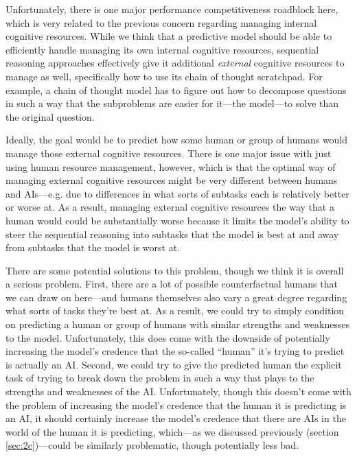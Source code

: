 \documentclass[
  onecolumn,
  nonatbib,
]{miri-tech-article}
\begin{document}
Unfortunately, there is one major performance competitiveness roadblock here, which is very related to the previous concern regarding managing internal cognitive resources. While we think that a predictive model should be able to efficiently handle managing its own internal cognitive resources, sequential reasoning approaches effectively give it additional \textit{external} cognitive resources to manage as well, specifically how to use its chain of thought scratchpad. For example, a chain of thought model has to figure out how to decompose questions in such a way that the subproblems are easier for it---the model---to solve than the original question.

Ideally, the goal would be to predict how some human or group of humans would manage those external cognitive resources. There is one major issue with just using human resource management, however, which is that the optimal way of managing external cognitive resources might be very different between humans and AIs---e.g. due to differences in what sorts of subtasks each is relatively better or worse at. As a result, managing external cognitive resources the way that a human would could be substantially worse because it limits the model's ability to steer the sequential reasoning into subtasks that the model is best at and away from subtasks that the model is worst at.

There are some potential solutions to this problem, though we think it is overall a serious problem. First, there are a lot of possible counterfactual humans that we can draw on here---and humans themselves also vary a great degree regarding what sorts of tasks they're best at. As a result, we could try to simply condition on predicting a human or group of humans with similar strengths and weaknesses to the model. Unfortunately, this does come with the downside of potentially increasing the model's credence that the so-called ``human'' it's trying to predict is actually an AI. Second, we could try to give the predicted human the explicit task of trying to break down the problem in such a way that plays to the strengths and weaknesses of the AI. Unfortunately, though this doesn't come with the problem of increasing the model's credence that the human it is predicting is an AI, it should certainly increase the model's credence that there are AIs in the world of the human it is predicting, which---as we discussed previously (section \ref{sec:2c})---could be similarly problematic, though potentially less bad.
\end{document}
